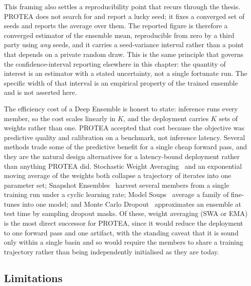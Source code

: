 This framing also settles a reproducibility point that recurs through the thesis.
PROTEA does not search for and report a lucky seed; it fixes a converged set of
seeds and reports the average over them. The reported figure is therefore a
converged estimator of the ensemble mean, reproducible from zero by a third party
using \emph{any} seeds, and it carries a seed-variance interval rather than a
point that depends on a private random draw. This is the same principle that
governs the confidence-interval reporting elsewhere in this chapter: the quantity
of interest is an estimator with a stated uncertainty, not a single fortunate
run. The specific width of that interval is an empirical property of the trained
ensemble and is not asserted here.

The efficiency cost of a Deep Ensemble is honest to state: inference runs every
member, so the cost scales linearly in $K$, and the deployment carries $K$ sets
of weights rather than one. PROTEA accepted that cost because the objective was
predictive quality and calibration on a benchmark, not inference latency. Several
methods trade some of the predictive benefit for a single cheap forward pass, and
they are the natural design alternatives for a latency-bound deployment rather
than anything PROTEA did. Stochastic Weight Averaging~\cite{izmailov2018swa} and
an exponential moving average of the weights both collapse a trajectory of
iterates into one parameter set; Snapshot Ensembles~\cite{huang2017snapshot}
harvest several members from a single training run under a cyclic learning rate;
Model Soups~\cite{wortsman2022modelsoups} average a family of fine-tunes into one
model; and Monte Carlo Dropout~\cite{gal2016dropout} approximates an ensemble at
test time by sampling dropout masks. Of these, weight averaging (SWA or EMA) is
the most direct successor for PROTEA, since it would reduce the deployment to one
forward pass and one artifact, with the standing caveat that it is sound only
within a single basin and so would require the members to share a training
trajectory rather than being independently initialised as they are today.

\subsection{Limitations}
\label{subsec:limitations}

